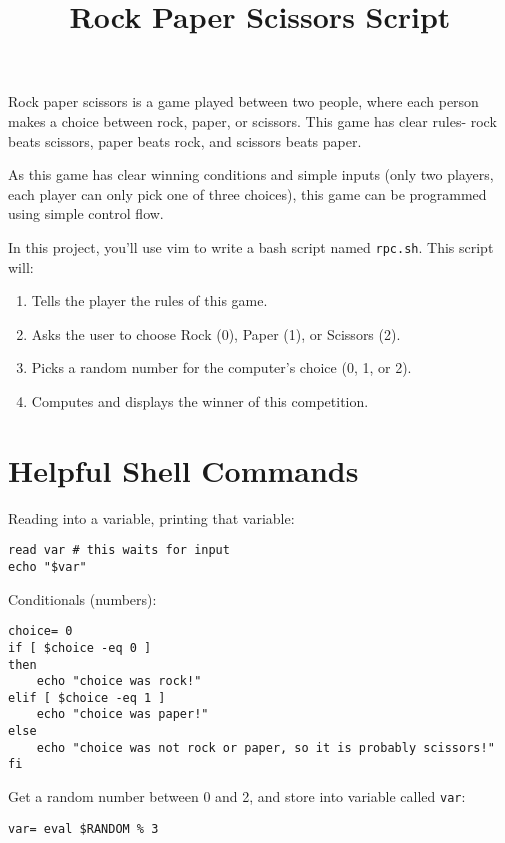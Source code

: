 \documentclass{article}
\title{Rock Paper Scissors Script}
\author{}
\date{}
\begin{document}
\maketitle
\thispagestyle{empty}

Rock paper scissors is a game played between two people, where each person
makes a choice between rock, paper, or scissors. This game has clear rules-
rock beats scissors, paper beats rock, and scissors beats paper.

As this game has clear winning conditions and simple inputs (only two players,
each player can only pick one of three choices), this game can be programmed
using simple control flow.

In this project, you'll use vim to write a bash script named \texttt{rpc.sh}. This script will:
\begin{enumerate}
    \item Tells the player the rules of this game.
    \item Asks the user to choose Rock (0), Paper (1), or Scissors (2).
    \item Picks a random number for the computer's choice (0, 1, or 2).
    \item Computes and displays the winner of this competition.
\end{enumerate}

\section*{Helpful Shell Commands}
Reading into a variable, printing that variable:
\begin{lstlisting}
read var # this waits for input
echo "$var"
\end{lstlisting}
Conditionals (numbers):
\begin{lstlisting}
choice= 0
if [ $choice -eq 0 ]
then
    echo "choice was rock!"
elif [ $choice -eq 1 ]
    echo "choice was paper!"
else
    echo "choice was not rock or paper, so it is probably scissors!"
fi
\end{lstlisting}
Get a random number between 0 and 2, and store into variable called \texttt{var}:
\begin{lstlisting}
var= eval $RANDOM % 3
\end{lstlisting}
\end{document}
